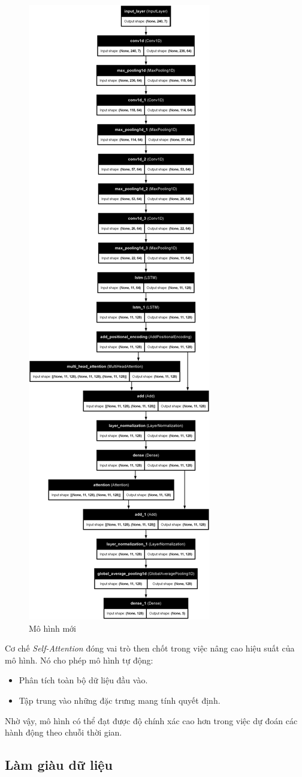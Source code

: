 \begin{figure}[H]
    \centering
    \includegraphics[width=0.4\linewidth]{Images/Improved methods/new_model_plot.png}
    \caption{Mô hình mới}
    \label{fig:new-model}
\end{figure}


\noindent
Cơ chế \textit{Self-Attention} đóng vai trò then chốt trong việc nâng cao hiệu suất của mô hình. Nó cho phép mô hình tự động:
\begin{itemize}
    \item Phân tích toàn bộ dữ liệu đầu vào.
    \item Tập trung vào những đặc trưng mang tính quyết định.
\end{itemize}

Nhờ vậy, mô hình có thể đạt được độ chính xác cao hơn trong việc dự đoán các hành động theo chuỗi thời gian.

\subsection{Làm giàu dữ liệu}
